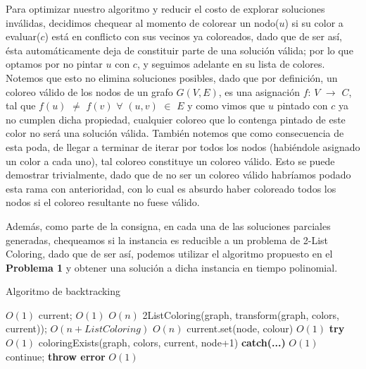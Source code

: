 \documentclass{article}
\theoremstyle{definition}
\theoremstyle{remark}
\begin{document}
Para optimizar nuestro algoritmo y reducir el costo de explorar soluciones inválidas, decidimos chequear al momento de colorear un nodo($u$) si su color a evaluar($c$) está en conflicto con sus vecinos ya coloreados, dado que de ser así, ésta automáticamente deja de constituir parte de una solución válida; por lo que optamos por no pintar $u$ con $c$, y seguimos adelante en su lista de colores.  
Notemos que esto no elimina soluciones posibles, dado que por definición, un coloreo válido de los nodos de un grafo $G(V,E)$, es una asignación $f$: $V$ $\rightarrow$ $C$, tal que $f(u)$ $\neq$ $f(v)$ $\forall$ $(u,v)$ $\in$ $E$ y como vimos que $u$ pintado con $c$ ya no cumplen dicha propiedad, cualquier coloreo que lo contenga pintado de este color no será una solución válida. También notemos que como consecuencia de esta poda, de llegar a terminar de iterar por todos los nodos (habiéndole asignado un color a cada uno), tal coloreo constituye un coloreo válido. Esto se puede demostrar trivialmente, dado que de no ser un coloreo válido habríamos podado esta rama con anterioridad, con lo cual es absurdo haber coloreado todos los nodos si el coloreo resultante no fuese válido. 

Además, como parte de la consigna, en cada una de las soluciones parciales generadas, chequeamos si la instancia es reducible a un problema de 2-List Coloring, dado que de ser así, podemos utilizar el algoritmo propuesto en el \textbf{Problema 1} y obtener una solución a dicha instancia en tiempo polinomial. 

\begin{algorithm}
\caption{Algoritmo de backtracking}
\label{ex2:pseudo1}

\begin{algorithmic}
 \Comment $O(1)$
    \State \Return current; \Comment $O(1)$
\Else
     \Comment $O(n)$
        \State 2ListColoring(graph, transform(graph, colors, current)); \Comment $ O(n + List Coloring)$
    \EndIf
         \Comment $O(n)$
            \State current.set(node, colour) \Comment $O(1)$
            \State \textbf{try} \Comment $O(1)$
            \State \indent \Return coloringExists(graph, colors, current, node+1)
            \State \textbf{catch(...)} \Comment $O(1)$
            \State \indent continue;
        \EndIf
    \EndFor
    \State \textbf{throw error} \Comment $O(1)$
\EndIf
\EndFunction
\end{algorithmic}
\end{algorithm}
\end{document}

